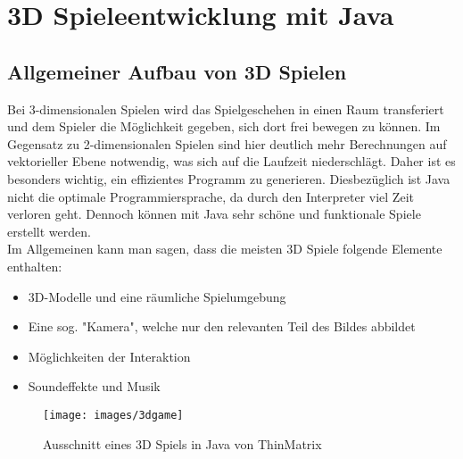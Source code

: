 \chapter{3D Spieleentwicklung mit Java}\label{ch:beispiele}

\section{Allgemeiner Aufbau von 3D Spielen}\label{sec:aufbau}

\nocite{*}

Bei 3-dimensionalen Spielen wird das Spielgeschehen in einen Raum transferiert und dem Spieler die Möglichkeit gegeben, sich dort frei bewegen zu können. \newline
Im Gegensatz zu 2-dimensionalen Spielen sind hier deutlich mehr Berechnungen auf vektorieller Ebene notwendig, was sich auf die Laufzeit niederschlägt. Daher ist es besonders wichtig, ein effizientes Programm zu generieren.
Diesbezüglich ist Java nicht die optimale Programmiersprache, da durch den Interpreter viel Zeit verloren geht. \newline
Dennoch können mit Java sehr schöne und funktionale Spiele erstellt werden.
\\
Im Allgemeinen kann man sagen, dass die meisten 3D Spiele folgende Elemente enthalten:
\begin{itemize}
	\item 3D-Modelle und eine räumliche Spielumgebung
	\item Eine sog. "Kamera", welche nur den relevanten Teil des Bildes abbildet
	\item Möglichkeiten der Interaktion
	\item Soundeffekte und Musik
\end{itemize}

\begin{figure}[h!]
		\texttt{[image: images/3dgame]}
		\caption[Beispiel eines 3D Spiels]{Ausschnitt eines 3D Spiels in Java von ThinMatrix \cite{Fig2}}
	
\end{figure}

\clearpage

